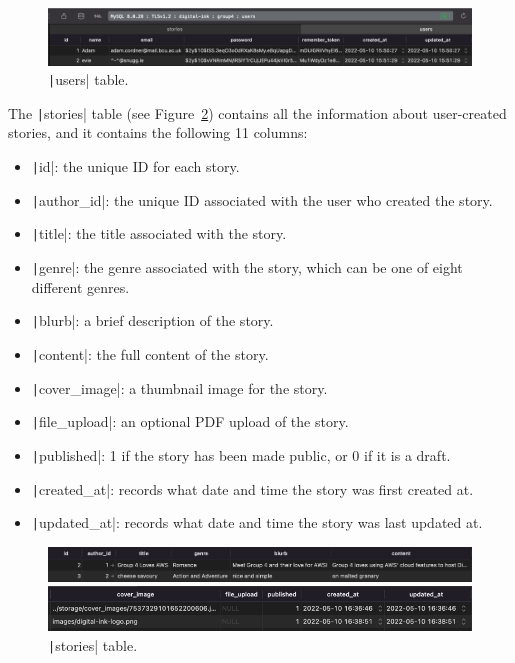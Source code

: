 \begin{figure}[!htbp]
    \centering
    \includegraphics[width=\textwidth]{resources/database/users-records}
    \caption{\texttt|users| table.}
    \label{fig:users-records}
\end{figure}

\clearpage
The \texttt|stories| table (see Figure~\ref{fig:stories-records}) contains all the information about
user-created stories, and it contains the following 11 columns:

\begin{itemize}
    \item \texttt|id|: the unique ID for each story.
    \item \texttt|author_id|: the unique ID associated with the user who created the story.
    \item \texttt|title|: the title associated with the story.
    \item \texttt|genre|: the genre associated with the story, which can be one of eight different genres.
    \item \texttt|blurb|: a brief description of the story.
    \item \texttt|content|: the full content of the story.
    \item \texttt|cover_image|: a thumbnail image for the story.
    \item \texttt|file_upload|: an optional PDF upload of the story.
    \item \texttt|published|: 1 if the story has been made public, or 0 if it is a draft.
    \item \texttt|created_at|: records what date and time the story was first created at.
    \item \texttt|updated_at|: records what date and time the story was last updated at.
\end{itemize}

\begin{figure}[!htbp]
    \centering
    \begin{subfloat}
        \includegraphics[width=\textwidth]{resources/database/stories-records-1}
    \end{subfloat}
    \begin{subfloat}
        \includegraphics[width=\textwidth]{resources/database/stories-records-2}
    \end{subfloat}
    \caption{\texttt|stories| table.}
    \label{fig:stories-records}
\end{figure}

